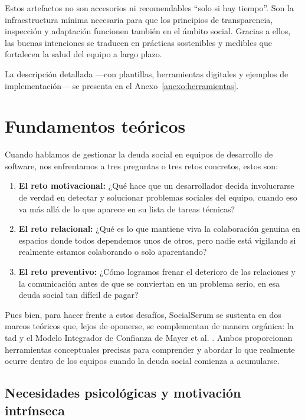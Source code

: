 Estos artefactos no son accesorios ni recomendables ``solo si hay tiempo''. Son la infraestructura mínima necesaria para que los principios de transparencia, inspección y adaptación funcionen también en el ámbito social.
Gracias a ellos, las buenas intenciones se traducen en prácticas sostenibles y medibles que fortalecen la salud del equipo a largo plazo.

La descripción detallada —con plantillas, herramientas digitales y ejemplos de implementación— se presenta en el Anexo~\ref{anexo:herramientas}.

\section{Fundamentos teóricos}
\label{sec:fundamentos-teoricos}

Cuando hablamos de gestionar la deuda social en equipos de desarrollo de software, nos enfrentamos a tres preguntas o tres retos concretos, estos son:

\begin{enumerate}
    \item \textbf{El reto motivacional:} ¿Qué hace que un desarrollador decida involucrarse de verdad en detectar y solucionar problemas sociales del equipo, cuando eso va más allá de lo que aparece en su lista de tareas técnicas?
    \item \textbf{El reto relacional:} ¿Qué es lo que mantiene viva la colaboración genuina en espacios donde todos dependemos unos de otros, pero nadie está vigilando si realmente estamos colaborando o solo aparentando?
    \item \textbf{El reto preventivo:} ¿Cómo logramos frenar el deterioro de las relaciones y la comunicación antes de que se conviertan en un problema serio, en esa deuda social tan difícil de pagar?
\end{enumerate}

Pues bien, para hacer frente a estos desafíos, SocialScrum se sustenta en dos marcos teóricos que, lejos de oponerse, se complementan de manera orgánica: la \acrfull{tad} \cite{ryan_self-determination_2000} y el Modelo Integrador de Confianza de Mayer et al. \cite{mayer_integrative_1995}. Ambos proporcionan herramientas conceptuales precisas para comprender y abordar lo que realmente ocurre dentro de los equipos cuando la deuda social comienza a acumularse.

\subsection{Necesidades psicológicas y motivación intrínseca}

